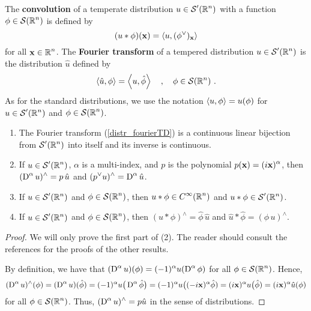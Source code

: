 The {\bfseries convolution} of a
temperate distribution $\displaystyle u \in \mathcal{S}'(\mathbb{R}^n)$ with a
function $\displaystyle \phi \in \mathcal{S}(\mathbb{R}^n)$ is defined by
\[
  (u \ast \phi)(\mathbf{x}) = \left\langle{u} , {(\phi^\vee)_{\mathbf{x}}}\right\rangle
\]
for all $\displaystyle \mathbf{x} \in \mathbb{R}^n$.
The {\bfseries Fourier transform}
of a tempered distribution $\displaystyle u \in \mathcal{S}'(\mathbb{R}^n)$ is the
distribution $\hat{u}$ defined by
\begin{equation} \label{distr_fourierTD}
\left\langle{\hat{u}} , {\phi}\right\rangle = \left\langle{u} , {\hat{\phi}}\right\rangle \quad , \quad \phi \in \mathcal{S}(\mathbb{R}^n) \ .
\end{equation}
As for the standard distributions, we use the notation
$\left\langle{u} , {\phi}\right\rangle = u(\phi)$ for $\displaystyle u \in \mathcal{S}'(\mathbb{R}^n)$ and
$\displaystyle \phi \in \mathcal{S}(\mathbb{R}^n)$.

\begin{prop} \label{distr_frr_tempD}
\begin{enumerate}
\item The Fourier transform (\ref{distr_fourierTD}) is a continuous
linear bijection from $\displaystyle \mathcal{S}'(\mathbb{R}^n)$ into itself and its
inverse is continuous.
\item If $\displaystyle u \in \mathcal{S}'(\mathbb{R}^n)$, $\alpha$ is a multi-index,
and $p$ is the polynomial $\displaystyle p(\mathbf{x}) = (i\mathbf{x})^\alpha$, then
$\displaystyle (\operatorname{D}^\alpha u)^\wedge = p\, \hat{u}$ and
$\displaystyle (p^\vee u)^\wedge = \operatorname{D}^\alpha\hat{u}$.
\item If $\displaystyle u \in \mathcal{S}'(\mathbb{R}^n)$ and
$\displaystyle \phi \in \mathcal{S}(\mathbb{R}^n)$, then
$\displaystyle u\ast \phi \in C^\infty(\mathbb{R}^n)$ and
$\displaystyle u\ast \phi \in \mathcal{S}'(\mathbb{R}^n)$.
\item If $\displaystyle u \in \mathcal{S}'(\mathbb{R}^n)$ and
$\displaystyle \phi \in \mathcal{S}(\mathbb{R}^n)$, then
$\displaystyle (u\ast \phi)^\wedge = \hat{\phi}\,\hat{u}$ and
$\displaystyle \hat{u}\ast \hat{\phi} = (\phi\,u)^\wedge$.
\end{enumerate}
\end{prop}

\begin{proof}
We will only prove the first part of (2).  The reader should consult
the references for the proofs of the other results.

By definition, we have that
$\displaystyle (\operatorname{D}^\alpha u)(\phi) = (-1)^\alpha u(\operatorname{D}^\alpha \phi)$
for all $\displaystyle \phi \in \mathcal{S}(\mathbb{R}^n)$.  Hence,
\[
(\operatorname{D}^\alpha u)^\wedge (\phi)
= (\operatorname{D}^\alpha u)(\hat{\phi})
= (-1)^\alpha u\big(\operatorname{D}^\alpha \hat{\phi}\big)
= (-1)^\alpha u\big((-i\mathbf{x})^\alpha \hat{\phi})
= (i\mathbf{x})^\alpha u\big( \hat{\phi})
= (i\mathbf{x})^\alpha \hat{u}(\phi)
\]
for all $\displaystyle \phi \in \mathcal{S}(\mathbb{R}^n)$.  Thus,
$\displaystyle (\operatorname{D}^\alpha u)^\wedge = p \hat{u}$ in the sense of
distributions.
\end{proof}

